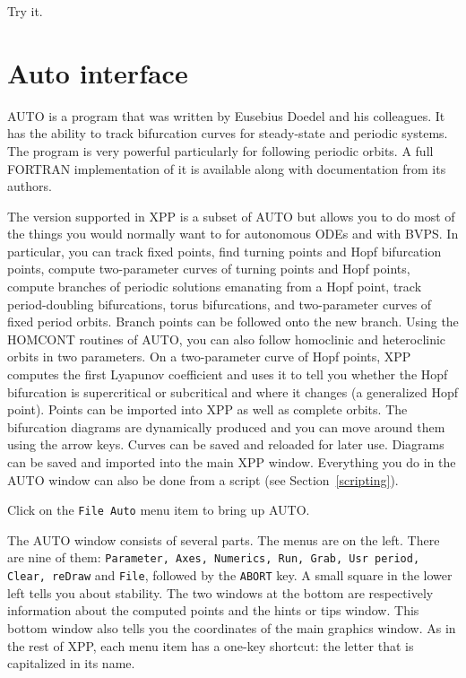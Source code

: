 \documentclass{article}
\newcommand{\tc}[1]{\addcontentsline{toc}{subsection}{#1}}
\begin{document}
Try it.

\section{Auto interface}

AUTO is a program that was written by Eusebius Doedel and his
colleagues.  It has the ability to track bifurcation curves for
steady-state and periodic systems.  The program is very powerful
particularly for following periodic orbits.  A full FORTRAN
implementation of it is available along with documentation from its
authors.

The version supported in XPP is a subset of AUTO but allows you to do
most of the things you would normally want to for autonomous ODEs and with
BVPS.  In
particular, you can track fixed points, find turning points and Hopf
bifurcation points, compute two-parameter curves of turning points and
Hopf points, compute branches of periodic solutions emanating from a
Hopf point, track period-doubling bifurcations, torus bifurcations,
and two-parameter curves of fixed period orbits.  Branch points can be
followed onto the new branch.  Using the HOMCONT routines of AUTO, you
can also follow homoclinic and heteroclinic orbits in two parameters.  On a
two-parameter curve of Hopf points, XPP computes the first Lyapunov
coefficient and uses it to tell you whether the Hopf bifurcation is
supercritical or subcritical and where it changes (a generalized Hopf
point).  Points can be
imported into XPP as well as complete orbits.  The bifurcation
diagrams are dynamically produced and you can move around them using
the arrow keys.  Curves can be saved and reloaded for later use.
Diagrams can be saved and imported into the main XPP window.
Everything you do in the AUTO window can also be done from a script
(see Section~\ref{scripting}).

Click on the {\tt File Auto} menu item to bring up AUTO.

\tc{The AUTO Window}  The AUTO window consists of several parts.  The
menus are on the left. There are nine of them: {\tt Parameter, Axes,
Numerics, Run, Grab, Usr period, Clear, reDraw} and {\tt File}, followed
by the {\tt ABORT} key.  A small square in the lower left tells you
about stability.  The two windows at the bottom are respectively
information about the computed points and the hints or tips window.
This bottom window also tells you the coordinates of the main graphics
window.  As in the rest of XPP, each menu item has a one-key shortcut:
the letter that is capitalized in its name.
\end{document}
